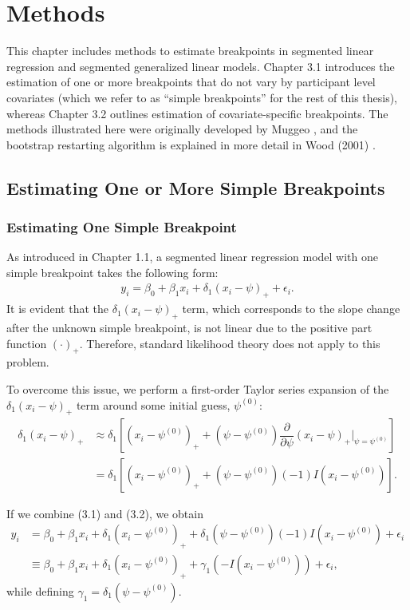\documentclass [12pt, proquest] {uwthesis}[2016/11/22]
\begin{document}
\chapter{Methods}

This chapter includes methods to estimate breakpoints in segmented linear regression and segmented generalized linear models. Chapter 3.1 introduces the estimation of one or more breakpoints that do not vary by participant level covariates (which we refer to as ``simple breakpoints'' for the rest of this thesis), whereas Chapter 3.2 outlines estimation of covariate-specific breakpoints. The methods illustrated here were originally developed by Muggeo \cite{VM2003, VM2014}, and the bootstrap restarting algorithm is explained in more detail in Wood (2001) \cite{SW2001}.
 
\section{Estimating One or More Simple Breakpoints}

\subsection{Estimating One Simple Breakpoint}

As introduced in Chapter 1.1, a segmented linear regression model with one simple breakpoint takes the following form:
\begin{align}
    y_i = \beta_0 + \beta_1 x_i + \delta_1 (x_i - \psi)_+ + \epsilon_i.
\end{align}
It is evident that the $\delta_1 (x_i - \psi)_+$ term, which corresponds to the slope change after the unknown simple breakpoint, is not linear due to the positive part function $(\cdot)_+$. Therefore, standard likelihood theory does not apply to this problem.

To overcome this issue, we perform a first-order Taylor series expansion of the $\delta_1 (x_i - \psi)_+$ term around some initial guess, $\psi^{(0)}$:
\begin{align}
    \delta_1 (x_i - \psi)_+ &\approx \delta_1 [(x_i - \psi^{(0)})_+ + (\psi - \psi^{(0)}) \dfrac{\partial}{\partial\psi} (x_i - \psi)_+ \Bigr|_{\psi = \psi^{(0)}}] \nonumber \\
    &= \delta_1 [(x_i - \psi^{(0)})_+ + (\psi - \psi^{(0)})(-1)I(x_i - \psi^{(0)})].
\end{align}

If we combine (3.1) and (3.2), we obtain
\begin{align}
    y_i &= \beta_0 + \beta_1 x_i + \delta_1 (x_i - \psi^{(0)})_+ + \delta_1 (\psi - \psi^{(0)})(-1)I(x_i - \psi^{(0)}) + \epsilon_i \nonumber \\
    &\equiv \beta_0 + \beta_1 x_i + \delta_1 (x_i - \psi^{(0)})_+ + \gamma_1(-I(x_i - \psi^{(0)})) + \epsilon_i,
\end{align}
while defining $\gamma_1 = \delta_1 (\psi - \psi^{(0)})$. 
\end{document}
